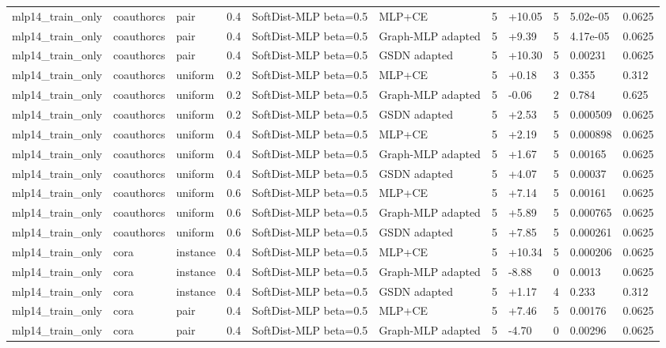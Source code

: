\begin{table}[t]
\begin{tabular}{llllllrlrll}
mlp14_train_only & coauthorcs & pair & 0.4 & SoftDist-MLP beta=0.5 & MLP+CE & 5 & +10.05 & 5 & 5.02e-05 & 0.0625 \\
mlp14_train_only & coauthorcs & pair & 0.4 & SoftDist-MLP beta=0.5 & Graph-MLP adapted & 5 & +9.39 & 5 & 4.17e-05 & 0.0625 \\
mlp14_train_only & coauthorcs & pair & 0.4 & SoftDist-MLP beta=0.5 & GSDN adapted & 5 & +10.30 & 5 & 0.00231 & 0.0625 \\
mlp14_train_only & coauthorcs & uniform & 0.2 & SoftDist-MLP beta=0.5 & MLP+CE & 5 & +0.18 & 3 & 0.355 & 0.312 \\
mlp14_train_only & coauthorcs & uniform & 0.2 & SoftDist-MLP beta=0.5 & Graph-MLP adapted & 5 & -0.06 & 2 & 0.784 & 0.625 \\
mlp14_train_only & coauthorcs & uniform & 0.2 & SoftDist-MLP beta=0.5 & GSDN adapted & 5 & +2.53 & 5 & 0.000509 & 0.0625 \\
mlp14_train_only & coauthorcs & uniform & 0.4 & SoftDist-MLP beta=0.5 & MLP+CE & 5 & +2.19 & 5 & 0.000898 & 0.0625 \\
mlp14_train_only & coauthorcs & uniform & 0.4 & SoftDist-MLP beta=0.5 & Graph-MLP adapted & 5 & +1.67 & 5 & 0.00165 & 0.0625 \\
mlp14_train_only & coauthorcs & uniform & 0.4 & SoftDist-MLP beta=0.5 & GSDN adapted & 5 & +4.07 & 5 & 0.00037 & 0.0625 \\
mlp14_train_only & coauthorcs & uniform & 0.6 & SoftDist-MLP beta=0.5 & MLP+CE & 5 & +7.14 & 5 & 0.00161 & 0.0625 \\
mlp14_train_only & coauthorcs & uniform & 0.6 & SoftDist-MLP beta=0.5 & Graph-MLP adapted & 5 & +5.89 & 5 & 0.000765 & 0.0625 \\
mlp14_train_only & coauthorcs & uniform & 0.6 & SoftDist-MLP beta=0.5 & GSDN adapted & 5 & +7.85 & 5 & 0.000261 & 0.0625 \\
mlp14_train_only & cora & instance & 0.4 & SoftDist-MLP beta=0.5 & MLP+CE & 5 & +10.34 & 5 & 0.000206 & 0.0625 \\
mlp14_train_only & cora & instance & 0.4 & SoftDist-MLP beta=0.5 & Graph-MLP adapted & 5 & -8.88 & 0 & 0.0013 & 0.0625 \\
mlp14_train_only & cora & instance & 0.4 & SoftDist-MLP beta=0.5 & GSDN adapted & 5 & +1.17 & 4 & 0.233 & 0.312 \\
mlp14_train_only & cora & pair & 0.4 & SoftDist-MLP beta=0.5 & MLP+CE & 5 & +7.46 & 5 & 0.00176 & 0.0625 \\
mlp14_train_only & cora & pair & 0.4 & SoftDist-MLP beta=0.5 & Graph-MLP adapted & 5 & -4.70 & 0 & 0.00296 & 0.0625 \\

\end{tabular}
\end{table}
